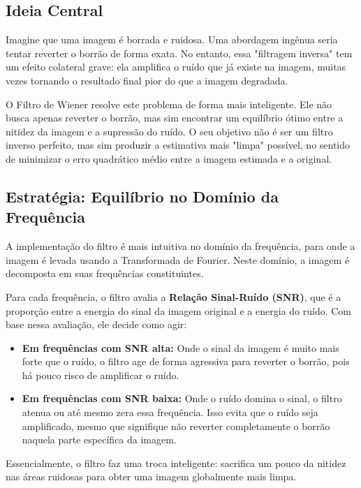 \documentclass[12pt]{article}
\begin{document}
\subsection{Ideia Central}

Imagine que uma imagem é borrada e ruidosa. Uma abordagem ingênua seria tentar reverter o borrão de forma exata. No entanto, essa "filtragem inversa" tem um efeito colateral grave: ela amplifica o ruído que já existe na imagem, muitas vezes tornando o resultado final pior do que a imagem degradada.

O Filtro de Wiener resolve este problema de forma mais inteligente. Ele não busca apenas reverter o borrão, mas sim encontrar um equilíbrio ótimo entre a nitidez da imagem e a supressão do ruído. O seu objetivo não é ser um filtro inverso perfeito, mas sim produzir a estimativa mais "limpa" possível, no sentido de minimizar o erro quadrático médio entre a imagem estimada e a original.

\subsection{Estratégia: Equilíbrio no Domínio da Frequência}

A implementação do filtro é mais intuitiva no domínio da frequência, para onde a imagem é levada usando a Transformada de Fourier. Neste domínio, a imagem é decomposta em suas frequências constituintes.

Para cada frequência, o filtro avalia a \textbf{Relação Sinal-Ruído (SNR)}, que é a proporção entre a energia do sinal da imagem original e a energia do ruído. Com base nessa avaliação, ele decide como agir:

\begin{itemize}
    \item \textbf{Em frequências com SNR alta:} Onde o sinal da imagem é muito mais forte que o ruído, o filtro age de forma agressiva para reverter o borrão, pois há pouco risco de amplificar o ruído.
    \item \textbf{Em frequências com SNR baixa:} Onde o ruído domina o sinal, o filtro atenua ou até mesmo zera essa frequência. Isso evita que o ruído seja amplificado, mesmo que signifique não reverter completamente o borrão naquela parte específica da imagem.
\end{itemize}

Essencialmente, o filtro faz uma troca inteligente: sacrifica um pouco da nitidez nas áreas ruidosas para obter uma imagem globalmente mais limpa.
\end{document}
